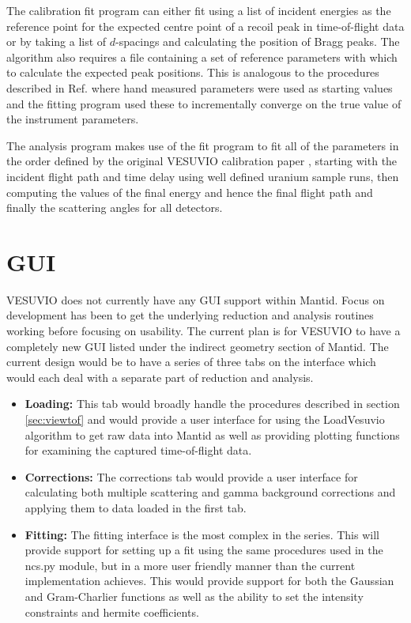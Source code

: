 \documentclass[paper=a4, fontsize=11pt]{scrartcl}	%
\numberwithin{equation}{section}															%
\numberwithin{figure}{section}																%
\numberwithin{table}{section}
\begin{document}
The calibration fit program can either fit using a list of incident energies as the reference point for the expected centre point of a recoil peak in time-of-flight data or by taking a list of $d$-spacings and calculating the position of Bragg peaks. The algorithm also requires a file containing a set of reference parameters with which to calculate the expected peak positions. This is analogous to the procedures described in Ref. \cite{mayers2011calibration} where hand measured parameters were used as starting values and the fitting program used these to incrementally converge on the true value of the instrument parameters.

The analysis program makes use of the fit program to fit all of the parameters in the order defined by the original VESUVIO calibration paper \cite{mayers2011calibration}, starting with the incident flight path and time delay using well defined uranium sample runs, then computing the values of the final energy and hence the final flight path and finally the scattering angles for all detectors.

\section{GUI}
\label{sec:GUI}
VESUVIO does not currently have any GUI support within Mantid. Focus on development has been to get the underlying reduction and analysis routines working before focusing on usability. The current plan is for VESUVIO to have a completely new GUI listed under the indirect geometry section of Mantid. The current design would be to have a series of three tabs on the interface which would each deal with a separate part of reduction and analysis.

\begin{itemize}
\item \textbf{Loading:} This tab would broadly handle the procedures described in section \ref{sec:viewtof} and would provide a user interface for using the LoadVesuvio algorithm to get raw data into Mantid as well as providing plotting functions for examining the captured time-of-flight data.

\item \textbf{Corrections:} The corrections tab would provide a user interface for calculating both multiple scattering and gamma background corrections and applying them to data loaded in the first tab.

\item \textbf{Fitting:} The fitting interface is the most complex in the series. This will provide support for setting up a fit using the same procedures used in the ncs.py module, but in a more user friendly manner than the current implementation achieves. This would provide support for both the Gaussian and Gram-Charlier functions as well as the ability to set the intensity constraints and hermite coefficients.
\end{itemize}
\end{document}
